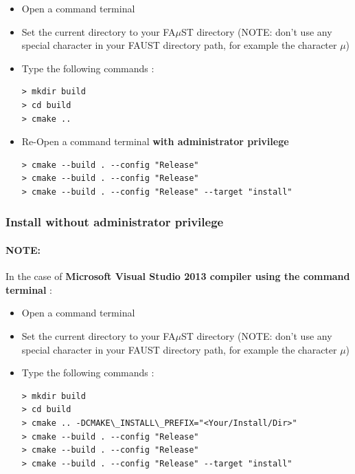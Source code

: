 \begin{itemize}
\item Open a command terminal
\item Set the current directory to your FA$\mu$ST directory (NOTE: don't use any special character in your FAUST directory path, for example the character $\mu$)
\item Type the following commands : 

\begin{lstlisting}
> mkdir build
> cd build
> cmake ..
\end{lstlisting}
\item Re-Open a command terminal \textbf{with administrator privilege} 
\begin{lstlisting}
> cmake --build . --config "Release"
> cmake --build . --config "Release"
> cmake --build . --config "Release" --target "install"
\end{lstlisting}
\end{itemize}

\subsubsection{Install without administrator privilege}
\label{sec:NoAdminWinVisualStudioTerminalBasicInstall}

\paragraph{NOTE:}In the case of \textbf{Microsoft Visual Studio 2013 compiler using the command terminal} :

\begin{itemize}
\item Open a command terminal
\item Set the current directory to your FA$\mu$ST directory (NOTE: don't use any special character in your FAUST directory path, for example the character $\mu$)
\item Type the following commands : 

\begin{lstlisting}
> mkdir build
> cd build
> cmake .. -DCMAKE\_INSTALL\_PREFIX="<Your/Install/Dir>" 
> cmake --build . --config "Release"
> cmake --build . --config "Release"
> cmake --build . --config "Release" --target "install"
\end{lstlisting}
\end{itemize}






